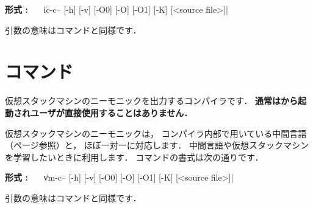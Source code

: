 \begin{flushleft}
{\bf 形式 : }~~~\|ic-c-- [-h] [-v] [-O0] [-O] [-O1] [-K] [<source file>]|
\end{flushleft}

引数の意味は{\cmmc}コマンドと同様です．

\section{{\vcmmc}コマンド}
\label{command:vcmmc}

仮想スタックマシンのニーモニックを出力する{\cmm}コンパイラです．
{\bf 通常は{\cmv}から起動されユーザが直接使用することはありません．}

仮想スタックマシンのニーモニックは，
コンパイラ内部で用いている中間言語（\pageref{app:vm}ページ参照）と，
ほぼ一対一に対応します．
中間言語や仮想スタックマシンを学習したいときに利用します．
{\vcmmc}コマンドの書式は次の通りです．

\begin{flushleft}
{\bf 形式 : }~~~\|vm-c-- [-h] [-v] [-O0] [-O] [-O1] [-K] [<source file>]|
\end{flushleft}

引数の意味は{\cmmc}コマンドと同様です．
%

